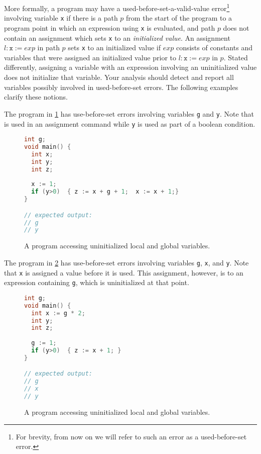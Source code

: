 \documentclass{article}
\begin{document}
More formally, a program may have a used-before-set-a-valid-value error\footnote{For brevity, from now on we will refer to such an error as a used-before-set error.} involving variable \texttt{x} if there is a path $p$ from the start of the program to a program point in which an expression using \texttt{x} is evaluated, and path $p$ does not contain an assignment which sets \texttt{x} to an \emph{initialized value}. An assignment $l: \texttt{x} := exp$ in path $p$ sets \texttt{x} to an initialized value if $exp$ consists of constants and variables that were assigned an initialized value prior to $l: \texttt{x} := exp$ in $p$.
Stated differently, assigning a variable with an expression involving an uninitialized value does not initialize that variable.
Your analysis should detect and report all variables possibly involved in used-before-set errors. The following examples clarify these notions. 

The program in \cref{fig:example-immediate} has use-before-set errors involving variables
\texttt{g} and \texttt{y}.
Note that  is used in an assignment command while \texttt{y} is used as part of a boolean condition.


\begin{figure}
\centering
\begin{lstlisting}[language=C]
int g;
void main() {
  int x;
  int y;
  int z;
  
  x := 1;
  if (y>0)  { z := x + g + 1;  x := x + 1;}
}

// expected output:
// g
// y
\end{lstlisting}
\caption{A program accessing uninitialized local and global variables.}
\label{fig:example-immediate}
\end{figure} 

The program in \cref{fig:example-flow} has use-before-set errors involving variables
\texttt{g}, \texttt{x}, and \texttt{y}.
Note that \texttt{x} is assigned a value before it is used. 
This assignment, however, is to an expression containing \texttt{g}, which is uninitialized at that point. 


\begin{figure}
\centering
\begin{lstlisting}[language=C]
int g;
void main() {
  int x := g * 2;
  int y;
  int z;
  
  g := 1;
  if (y>0)  { z := x + 1; }
}

// expected output:
// g
// x
// y
\end{lstlisting}
\caption{A program accessing uninitialized local and global variables.}
\label{fig:example-flow}
\end{figure} 
 
\end{document}
